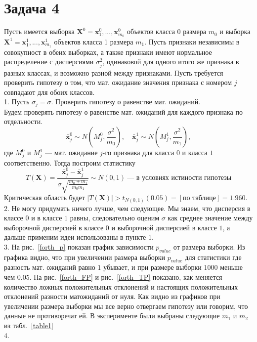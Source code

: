 \documentclass[12pt, twoside]{article}
\begin{document}
\section{Задача 4}
Пусть имеется выборка $\textbf{X}^0 = \textbf{x}^0_1, ..., \textbf{x}^0_{m_0}$ объектов класса 0 размера $m_0$ и выборка $\textbf{X}^1 = \textbf{x}^1_1, ..., \textbf{x}^1_{m_1}$ объектов класса 1 размера $m_1$. Пусть признаки независимы в совокупност в обеих выборках, а также признаки имеют нормальное распределение с дисперсиями $\sigma^2_j$, одинаковой для одного  итого же признака в разных классах, и возможно разной между признаками. Пусть требуется проверить гипотезу о том, что мат. ожидание значения признака с номером $j$  совпадают для обоих классов.\\
1. Пусть $\sigma_j = \sigma$. Проверить гипотезу о равенстве мат. ожиданий.\\
Будем проверять гипотезу о равенстве мат. ожиданий для каждого признака по отдельности.
$$\bar{\textbf{x}}^0_j \sim N(M^0_{j}, \frac{\sigma^2}{m_0}), \quad \bar{\textbf{x}}^1_j \sim N(M^1_{j}, \frac{\sigma^2}{m_1}),$$
где $M^0_j$ и $M^1_j$ --- мат. ожидание $j$-го признака для класса $0$ и класса $1$ соответственно. Тогда построим статистику  
$$T(\textbf{X})= \frac{\bar{\textbf{x}}^0_j - \bar{\textbf{x}}^1_j}{\sigma\sqrt{\frac{m_0+m_1}{m_0m_1}}} \sim N(0,1)~\text{--- в условиях истиности гипотезы}$$
Критическая область будет $|T(\textbf{X})| > t_{N(0,1)}(0.05) = [\text{по таблице}] = 1.960$.\\
2. Не могу придумать ничего лучше, чем следующее. Мы знаем, что дисперсия в классе $0$  и в классе $1$ равны, следовательно оценим $\sigma$ как среднее значение между выборочной дисперсией в классе $0$ и выборочной дисперсией в классе $1$, а дальше применим идеи использованы в пункте 1.\\
3. На рис.~\ref{forth_p} показан график зависимости $p_{value}$ от размера выборки. Из графика видно, что при увеличении размера выборки $p_{value}$ для  статистики где разность мат. ожиданий равно $1$ убывает, и при размере выборки $1000$  меньше чем 0.05. На рис.~\ref{forth_FP} и рис.~\ref{forth_TP} показано, как меняется количество ложных положительных отклонений и  настоящих положительных отклонений разности матожиданий от нуля. Как видно из графиков при увеличении размера выборки мы все верно отвергаем гипотезу или говорим, что данные не противоречат ей. В эксперименте были выбраны следующие $m_1$ и $m_2$ из табл.~\ref{table1}\\
4. 
\end{document}
